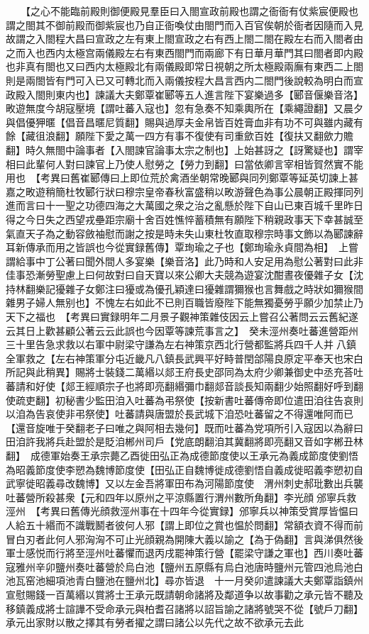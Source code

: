 　　【之心不能臨前殿則御便殿見羣臣曰入閤宣政前殿也謂之衙衙有仗紫宸便殿也謂之閤其不御前殿而御紫宸也乃自正衙喚仗由閤門而入百官俟朝於衙者因隨而入見故謂之入閤程大昌曰宣政之左有東上閤宣政之右有西上閤二閤在殿左右而入閤者由之而入也西内太極宫兩儀殿左右有東西閤門而兩廊下有日華月華門其曰閤者即内殿也非真有閤也又曰西内太極殿北有兩儀殿即常日視朝之所太極殿兩廡有東西二上閤則是兩閤皆有門可入已又可轉北而入兩儀按程大昌言西内二閤門後說較為明白而宣政殿入閤則東内也】諫議大夫鄭覃崔郾等五人進言陛下宴樂過多【郾音偃樂音洛】畋遊無度今胡寇壓境【謂吐蕃入寇也】忽有急奏不知乘輿所在【乘繩證翻】又晨夕與倡優狎暱【倡音昌暱尼質翻】賜與過厚夫金帛皆百姓膏血非有功不可與雖内藏有餘【藏徂浪翻】願陛下愛之萬一四方有事不復使有司重歛百姓【復扶又翻歛力贍翻】時久無閤中論事者【入閤諫官論事太宗之制也】上始甚訝之【訝驚疑也】謂宰相曰此輩何人對曰諫官上乃使人慰勞之【勞力到翻】曰當依卿言宰相皆賀然實不能用也　【考異曰舊崔郾傳曰上即位荒於禽酒坐朝常晚郾與同列鄭覃等延英切諫上甚嘉之畋遊稍簡杜牧郾行狀曰穆宗皇帝春秋富盛稍以畋游聲色為事公晨朝正殿揮同列進而言曰十一聖之功德四海之大萬國之衆之治之亂懸於陛下自山已東百城千里昨日得之今日失之西望戎壘距宗廟十舍百姓憔悴蓄積無有願陛下稍親政事天下幸甚誠至氣直天子為之動容斂袖慰而謝之按是時未失山東杜牧直取穆宗時事文飾以為郾諫辭耳新傳承而用之皆誤也今從實録舊傳】覃珣瑜之子也【鄭珣瑜永貞間為相】　上嘗謂給事中丁公著曰聞外間人多宴樂【樂音洛】此乃時和人安足用為慰公著對曰此非佳事恐漸勞聖慮上曰何故對曰自天寶以來公卿大夫競為遊宴沈酣晝夜優雜子女【沈持林翻樂記獶雜子女鄭注曰獶或為優孔穎達曰獶雜謂獮猴也言舞戲之時狀如獮猴間雜男子婦人無别也】不愧左右如此不已則百職皆廢陛下能無獨憂勞乎願少加禁止乃天下之福也　【考異曰實録明年二月景子觀神策雜伎因云上嘗召公著問云云舊紀遂云其日上歡甚顧公著云云此誤也今因覃等諫荒事言之】　癸未涇州奏吐蕃進營距州三十里告急求救以右軍中尉梁守謙為左右神策京西北行營都監將兵四千人并八鎮全軍救之【左右神策軍分屯近畿凡八鎮長武興平好畤普閏郃陽良原定平奉天也宋白所記與此稍異】賜將士裝錢二萬緡以郯王府長史邵同為太府少卿兼御史中丞充荅吐蕃請和好使【郯王經順宗子也將即亮翻緡彌巾翻郯音談長知兩翻少始照翻好呼到翻使疏吏翻】初秘書少監田洎入吐蕃為弔祭使【按新書吐蕃傳帝即位遣田洎往告哀則以洎為告哀使非弔祭使】吐蕃請與唐盟於長武城下洎恐吐蕃留之不得還唯阿而已【還音旋唯于癸翻老子曰唯之與阿相去幾何】既而吐蕃為党項所引入寇因以為辭曰田洎許我將兵赴盟於是貶洎郴州司戶【党底朗翻洎其冀翻將即亮翻又音如字郴丑林翻】　成德軍始奏王承宗薨乙酉徙田弘正為成德節度使以王承元為義成節度使劉悟為昭義節度使李愬為魏博節度使【田弘正自魏博徙成德劉悟自義成徙昭義李愬初自武寧徙昭義尋改魏博】又以左金吾將軍田布為河陽節度使　渭州刺史郝玭數出兵襲吐蕃營所殺甚衆【元和四年以原州之平涼縣置行渭州數所角翻】李光顔邠寧兵救涇州　【考異曰舊傳光顔救涇州事在十四年今從實録】邠寧兵以神策受賞厚皆愠曰人給五十緡而不識戰鬭者彼何人邪【謂上即位之賞也愠於問翻】常額衣資不得而前冒白刃者此何人邪洶洶不可止光顔親為開陳大義以諭之【為于偽翻】言與涕俱然後軍士感悦而行將至涇州吐蕃懼而退丙戌罷神策行營【罷梁守謙之軍也】西川奏吐蕃寇雅州辛卯鹽州奏吐蕃營於烏白池【鹽州五原縣有烏白池唐時鹽州元管四池烏池白池瓦窑池細項池青白鹽池在鹽州北】尋亦皆退　十一月癸卯遣諫議大夫鄭覃詣鎮州宣慰賜錢一百萬緡以賞將士王承元既請朝命諸將及鄰道争以故事勸之承元皆不聽及移鎮義成將士諠譁不受命承元與柏耆召諸將以詔旨諭之諸將號哭不從【號戶刀翻】承元出家財以散之擇其有勞者擢之謂曰諸公以先代之故不欲承元去此